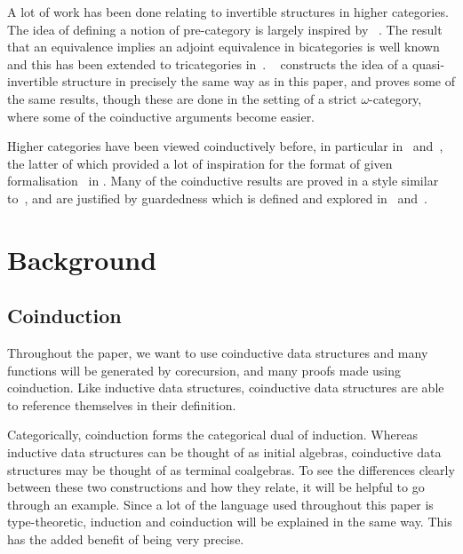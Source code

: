 \documentclass{article}
\theoremstyle{definition}
\theoremstyle{remark}
\begin{document}
A lot of work has been done relating to invertible structures in higher categories. The idea of defining a notion of pre-category is largely inspired by \citeauthor{Cheng2007}~\cite{Cheng2007}. The result that an equivalence implies an adjoint equivalence in bicategories is well known and this has been extended to tricategories in~\cite{gurski2012biequivalences}. \citeauthor*{lafont2007folk}~\cite{lafont2007folk} constructs the idea of a quasi-invertible structure in precisely the same way as in this paper, and proves some of the same results, though these are done in the setting of a strict \(\omega\)-category, where some of the coinductive arguments become easier.

Higher categories have been viewed coinductively before, in particular in~\cite{cheng2012weak} and~\cite{hirschowitz_et_al:LIPIcs:2015:5166}, the latter of which provided a lot of inspiration for the format of given formalisation~\cite{rice_agda} in . Many of the coinductive results are proved in a style similar to~\cite{kozen_silva_2017}, and are justified by guardedness which is defined and explored in~\cite{10.1007/3-540-58085-9_72} and~\cite{gimenez1995codifying}.


\section{Background}\label{sec:background}

\subsection{Coinduction}\label{sec:coinduction}

Throughout the paper, we want to use coinductive data structures and many functions will be generated by corecursion, and many proofs made using coinduction. Like inductive data structures, coinductive data structures are able to reference themselves in their definition.

Categorically, coinduction forms the categorical dual of induction. Whereas inductive data structures can be thought of as initial algebras, coinductive data structures may be thought of as terminal coalgebras. To see the differences clearly between these two constructions and how they relate, it will be helpful to go through an example. Since a lot of the language used throughout this paper is type-theoretic, induction and coinduction will be explained in the same way. This has the added benefit of being very precise.
\end{document}
